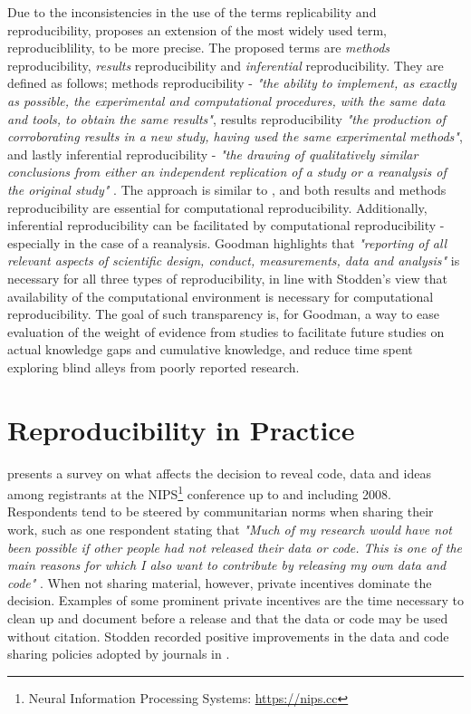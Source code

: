Due to the inconsistencies in the use of the terms replicability and reproducibility, \cite{Goodman341ps12} proposes an extension of the most widely used term, reproduciblility, to be more precise. The proposed terms are \emph{methods} reproducibility, \emph{results} reproducibility and \emph{inferential} reproducibility. They are defined as follows; methods reproducibility - \emph{"the ability to implement, as exactly as possible, the experimental and computational procedures, with the same data and tools, to obtain the same results"}, results reproducibility \emph{"the production of corroborating results in a new study, having used the same experimental methods"}, and lastly inferential reproducibility - \emph{"the drawing of qualitatively similar conclusions from either an independent replication of a study or a reanalysis of the original study"} \citep{Goodman341ps12}. The approach is similar to \cite{stodden2013resolving}, and both results and methods reproducibility are essential for computational reproducibility. Additionally, inferential reproducibility can be facilitated by computational reproducibility - especially in the case of a reanalysis. Goodman highlights that \emph{"reporting of all relevant aspects of scientific design, conduct, measurements, data and analysis"} is necessary for all three types of reproducibility, in line with Stodden's view that availability of the computational environment is necessary for computational reproducibility. The goal of such transparency is, for Goodman, a way to ease evaluation of the weight of evidence from studies to facilitate future studies on actual knowledge gaps and cumulative knowledge, and reduce time spent exploring blind alleys from poorly reported research.

\section{Reproducibility in Practice} \label{sec:practice}
\cite{stodden2010machinelearning} presents a survey on what affects the decision to reveal code, data and ideas among registrants at the NIPS\footnote{Neural Information Processing Systems: \url{https://nips.cc}} conference up to and including 2008. Respondents tend to be steered by communitarian norms when sharing their work, such as one respondent stating that \emph{"Much of my research would have not been possible if other people had not released their data or code. This is one of the main reasons for which I also want to contribute by releasing my own data and code"} \citep{stodden2010machinelearning}. When not sharing material, however, private incentives dominate the decision. Examples of some prominent private incentives are the time necessary to clean up and document before a release and that the data or code may be used without citation. Stodden recorded positive improvements in the data and code sharing policies adopted by journals in \cite{stodden2013journals}.

